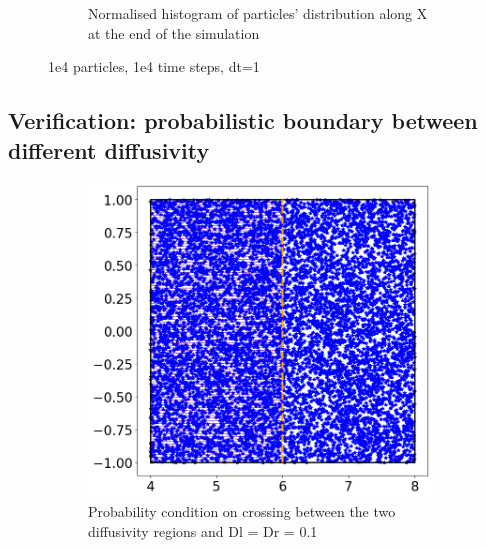 \documentclass{article}
\begin{document}
\begin{figure}[htbp]
\begin{subfigure}[b]{0.45\textwidth}
        \caption{Normalised histogram of particles' distribution along X at the end of the simulation}
    \end{subfigure}
    \caption{1e4 particles, 1e4 time steps, dt=1}
    \label{fig:MatrixDiffusion2}
\end{figure}

\FloatBarrier  %
\subsection{Verification: probabilistic boundary between different diffusivity}
\begin{figure}[htbp]
    \centering
    \begin{subfigure}[b]{0.45\textwidth}
        \centering
        \includegraphics[width=\textwidth]{images/positionsDl01Dr01RlPlRrPr.png}
        \caption{Probability condition on crossing between the two diffusivity regions and Dl = Dr = 0.1}
    \end{subfigure}
    \hfill
    \begin{subfigure}[b]{0.45\textwidth}
        \centering

\end{subfigure}
\end{figure}
\end{document}
